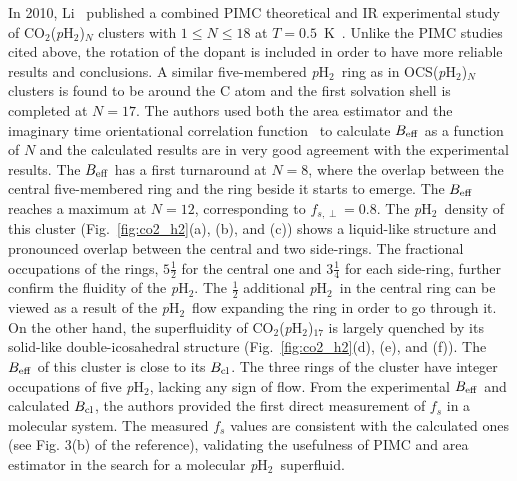 \documentclass[12pt]{iopart}
\newcommand{\phtwo}{{\em p}H$_2$}
\begin{document}
In 2010, Li \etal~published a combined PIMC theoretical and IR experimental study of CO$_2$(\phtwo)$_N$ clusters with $1\le N \le 18$ at $T=0.5$~K~\cite{huili_prl}. 
Unlike the PIMC studies cited above, the rotation of the dopant is included in order to have more reliable results and conclusions. 
A similar five-membered \phtwo~ring as in OCS(\phtwo)$_N$ clusters is found to be around the C atom and the first solvation shell is completed at $N=17$. 
The authors used both the area estimator and the imaginary time orientational correlation function~\cite{blinov_RCF} to calculate $B_{\rm eff}$ as a function of $N$ and the calculated results are in very good agreement with the experimental results. 
The $B_{\rm eff}$ has a first turnaround at $N=8$, where the overlap between the central five-membered ring and the ring beside it starts to emerge. 
The $B_{\rm eff}$ reaches a maximum at $N=12$, corresponding to $f_{s,\perp}=0.8$. 
The \phtwo~density of this cluster (Fig.~\ref{fig:co2_h2}(a), (b), and (c)) shows a liquid-like structure and pronounced overlap between the central and two side-rings. 
The fractional occupations of the rings, $5\frac{1}{2}$ for the central one and $3\frac{1}{4}$ for each side-ring, 
further confirm the fluidity of the \phtwo. 
The $\frac{1}{2}$ additional \phtwo~in the central ring can be viewed as a result of the \phtwo~flow expanding the ring in order to go through it. 
On the other hand, the superfluidity of CO$_2$(\phtwo)$_{17}$ is largely quenched by its solid-like double-icosahedral structure (Fig.~\ref{fig:co2_h2}(d), (e), and (f)). 
The $B_{\rm eff}$ of this cluster is close to its $B_{\rm cl}$. 
The three rings of the cluster have integer occupations of five \phtwo, lacking any sign of flow. 
From the experimental $B_{\rm eff}$ and calculated $B_{\rm cl}$, the authors provided the first direct measurement of $f_s$ in a molecular system. 
The measured $f_s$ values are consistent with the calculated ones (see Fig. 3(b) of the reference), validating the usefulness of PIMC and area estimator in the search for a molecular \phtwo~superfluid.
\end{document}
